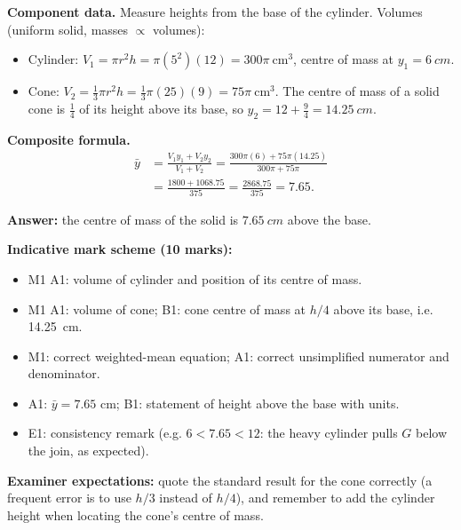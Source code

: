 \documentclass[11pt]{article}
\begin{document}
\begin{corrige}
\textbf{Component data.} Measure heights from the base of the cylinder. Volumes (uniform solid, masses $\propto$ volumes):
\begin{itemize}
\item Cylinder: $V_1 = \pi r^2 h = \pi(5^2)(12) = 300\pi\ \mathrm{cm^3}$, centre of mass at $y_1 = \SI{6}{cm}$.
\item Cone: $V_2 = \tfrac13\pi r^2 h = \tfrac13\pi(25)(9) = 75\pi\ \mathrm{cm^3}$. The centre of mass of a solid cone is $\tfrac14$ of its height above its base, so $y_2 = 12 + \tfrac{9}{4} = \SI{14.25}{cm}$.
\end{itemize}

\textbf{Composite formula.}
\begin{align*}
\bar{y} &= \frac{V_1 y_1 + V_2 y_2}{V_1 + V_2}
= \frac{300\pi(6) + 75\pi(14.25)}{300\pi + 75\pi}\\[2pt]
&= \frac{1800 + 1068.75}{375} = \frac{2868.75}{375} = 7.65.
\end{align*}

\textbf{Answer:} the centre of mass of the solid is $\SI{7.65}{cm}$ above the base.

\textbf{Indicative mark scheme (10 marks):}
\begin{itemize}
\item M1 A1: volume of cylinder and position of its centre of mass.
\item M1 A1: volume of cone; B1: cone centre of mass at $h/4$ above its base, i.e. \SI{14.25}{cm}.
\item M1: correct weighted-mean equation; A1: correct unsimplified numerator and denominator.
\item A1: $\bar{y} = 7.65$ cm; B1: statement of height above the base with units.
\item E1: consistency remark (e.g. $6 < 7.65 < 12$: the heavy cylinder pulls $G$ below the join, as expected).
\end{itemize}
\textbf{Examiner expectations:} quote the standard result for the cone correctly (a frequent error is to use $h/3$ instead of $h/4$), and remember to add the cylinder height when locating the cone's centre of mass.
\end{corrige}
\end{document}
